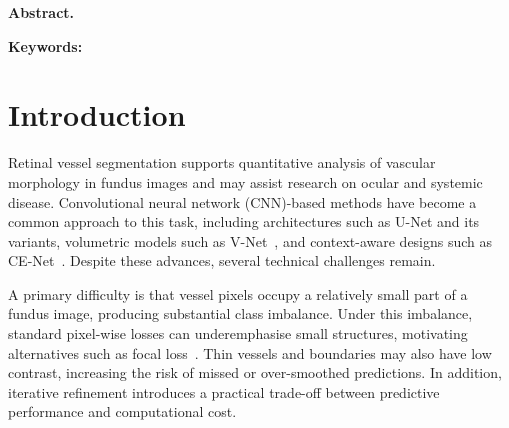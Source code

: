 \documentclass[jimaging,article,submit,pdftex,moreauthors]{Definitions/mdpi}%
\begin{document}
\ifmdpiclass

\else

\begin{center}

  {\LARGE\bfseries \papertitle\par}

  \vspace{0.8em}

  {\large \paperauthor\par}

  \vspace{0.6em}

  {\small \paperaddress\par}

  \vspace{0.3em}

  {\small \papercorres\par}

\end{center}

\vspace{0.8em}

\noindent\textbf{Abstract.} \paperabstract\par

\vspace{0.5em}

\noindent\textbf{Keywords:} \paperkeywords\par

\vspace{1em}

\fi







\section{Introduction}



Retinal vessel segmentation supports quantitative analysis of vascular morphology in fundus images and may assist research on ocular and systemic disease. Convolutional neural network (CNN)-based methods have become a common approach to this task, including architectures such as U-Net and its variants, volumetric models such as V-Net~\cite{Milletari2016}, and context-aware designs such as CE-Net~\cite{Gu2019CENet}. Despite these advances, several technical challenges remain.



A primary difficulty is that vessel pixels occupy a relatively small part of a fundus image, producing substantial class imbalance. Under this imbalance, standard pixel-wise losses can underemphasise small structures, motivating alternatives such as focal loss~\cite{Lin2017}. Thin vessels and boundaries may also have low contrast, increasing the risk of missed or over-smoothed predictions. In addition, iterative refinement introduces a practical trade-off between predictive performance and computational cost.
\end{document}
